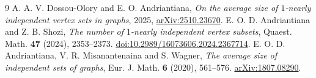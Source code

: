 \documentclass[11pt,a4paper]{article}
\begin{document}
\begin{thebibliography}{9}\small
{} A. A. V. Dossou-Olory and E. O. Andriantiana, \emph{On the average size of $1$-nearly independent vertex sets in graphs}, 2025, \href{https://arxiv.org/abs/2510.23670}{arXiv:2510.23670}.
 E. O. D. Andriantiana and Z. B. Shozi, \emph{The number of $1$-nearly independent vertex subsets}, Quaest. Math. \textbf{47} (2024), 2353--2373. \href{https://doi.org/10.2989/16073606.2024.2367714}{doi:10.2989/16073606.2024.2367714}.
 E. O. D. Andriantiana, V. R. Misanantenaina and S. Wagner, \emph{The average size of independent sets of graphs}, Eur. J. Math. \textbf{6} (2020), 561--576. \href{https://arxiv.org/abs/1807.08290}{arXiv:1807.08290}.
\end{thebibliography}
\end{document}
